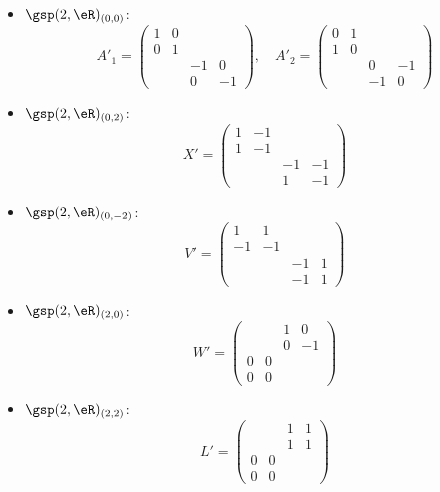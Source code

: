 \begin{itemize}
	\item $\gsp(2,\eR)_{(0,0)}$:
	      \[
		      A'_1=
		      \begin{pmatrix}
			      1 & 0           \\
			      0 & 1           \\
			        &   & -1 & 0  \\
			        &   & 0  & -1
		      \end{pmatrix},
		      \quad
		      A'_2=
		      \begin{pmatrix}
			      0 & 1           \\
			      1 & 0           \\
			        &   & 0  & -1 \\
			        &   & -1 & 0
		      \end{pmatrix}
	      \]
	\item $\gsp(2,\eR)_{(0,2)}$:
	      \[
		      X'= \begin{pmatrix}
			      1 & -1 &         \\
			      1 & -1 &         \\
			        &    & -1 & -1 \\
			        &    & 1  & -1
		      \end{pmatrix}
	      \]
	\item $\gsp(2,\eR)_{(0,-2)}$:
	      \[
		      V'= \begin{pmatrix}
			      1  & 1           \\
			      -1 & -1          \\
			         &    & -1 & 1 \\
			         &    & -1 & 1
		      \end{pmatrix}
	      \]
	\item $\gsp(2,\eR)_{(2,0)}$:
	      \[
		      W'= \begin{pmatrix}
			        &   & 1 & 0  \\
			        &   & 0 & -1 \\
			      0 & 0          \\0&0
		      \end{pmatrix}
	      \]
	\item $\gsp(2,\eR)_{(2,2)}$:
	      \[
		      L'=
		      \begin{pmatrix}
			        &   & 1 & 1 \\
			        &   & 1 & 1 \\
			      0 & 0         \\0&0
		      \end{pmatrix}
\]
\end{itemize}

